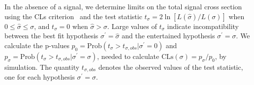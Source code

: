 In the absence of  a signal, we determine limits on the total signal cross section using the CLs
criterion~\cite{LHCCLs} and the test statistic $t_\sigma = 2 \ln [ L(\hat{\sigma}) /  L(\sigma)]$
when $0 \leq\hat{\sigma} \leq \sigma$, and $t_\sigma = 0$ when $\hat{\sigma} > \sigma$. 
Large values of $t_\sigma$ indicate incompatibility between the best fit hypothesis $\sigma^\prime 
= \hat{\sigma}$ and the entertained hypothesis $\sigma^\prime  = \sigma$. 
We calculate  the p-values $p_0 = \textrm{Prob}(t_\sigma > t_{\sigma, obs} | \sigma^\prime = 0)$ 
and $p_\sigma = \textrm{Prob}(t_\sigma > t_{\sigma, obs} | \sigma^\prime=\sigma)$, needed to
calculate $\textrm{CLs}(\sigma) = p_\sigma / p_0$,  by simulation. 
The quantity $t_{\sigma, obs}$ denotes the observed values of the test statistic, one for each
hypothesis $\sigma^\prime=\sigma$.
